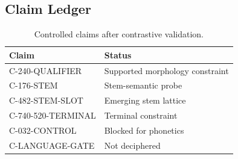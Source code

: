 \subsection{Claim Ledger}

\begin{table}[htbp]
\centering
\footnotesize
\begin{tabular}{p{}p{}}
\toprule
\textbf{Claim} & \textbf{Status} \\
\midrule
C-240-QUALIFIER & Supported morphology constraint \\
C-176-STEM & Stem-semantic probe \\
C-482-STEM-SLOT & Emerging stem lattice \\
C-740-520-TERMINAL & Terminal constraint \\
C-032-CONTROL & Blocked for phonetics \\
C-LANGUAGE-GATE & Not deciphered \\
\bottomrule
\end{tabular}
\caption{Controlled claims after contrastive validation.}
\end{table}
